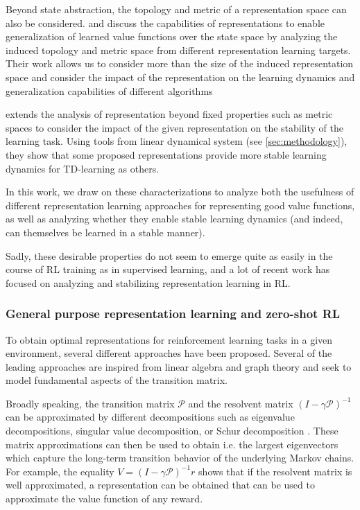 Beyond state abstraction, the topology and metric of a representation space can also be considered. 
\textcite{le2021metrics} and \textcite{le2022generalization} discuss the capabilities of representations to enable generalization of learned value functions over the state space by analyzing the induced topology and metric space from different representation learning targets.
Their work allows us to consider more than the size of the induced representation space and consider the impact of the representation on the learning dynamics and generalization capabilities of different algorithms

\textcite{ghosh2020representations} extends the analysis of representation beyond fixed properties such as metric spaces to consider the impact of the given representation on the stability of the learning task.
Using tools from linear dynamical system (see \autoref{sec:methodology}), they show that some proposed representations provide more stable learning dynamics for TD-learning as others.

In this work, we draw on these characterizations to analyze both the usefulness of different representation learning approaches for representing good value functions, as well as analyzing whether they enable stable learning dynamics (and indeed, can themselves be learned in a stable manner).

Sadly, these desirable properties do not seem to emerge quite as easily in the course of RL training as in supervised learning, and a lot of recent work has focused on analyzing and stabilizing representation learning in RL.

\subsubsection{General purpose representation learning and zero-shot RL}

To obtain optimal representations for reinforcement learning tasks in a given environment, several different approaches have been proposed.
Several of the leading approaches are inspired from linear algebra and graph theory and seek to model fundamental aspects of the transition matrix.

Broadly speaking, the transition matrix $\mathcal{P}$ and the resolvent matrix $(I - \gamma \mathcal{P})^{-1}$ can be approximated by different decompositions such as eigenvalue decompositions, singular value decomposition, or Schur decomposition \parencite{ghosh2020representations}.
These matrix approximations can then be used to obtain i.e. the largest eigenvectors which capture the long-term transition behavior of the underlying Markov chains.
For example, the equality $V = (I - \gamma \mathcal{P})^{-1} r$ shows that if the resolvent matrix is well approximated, a representation can be obtained that can be used to approximate the value function of any reward.


